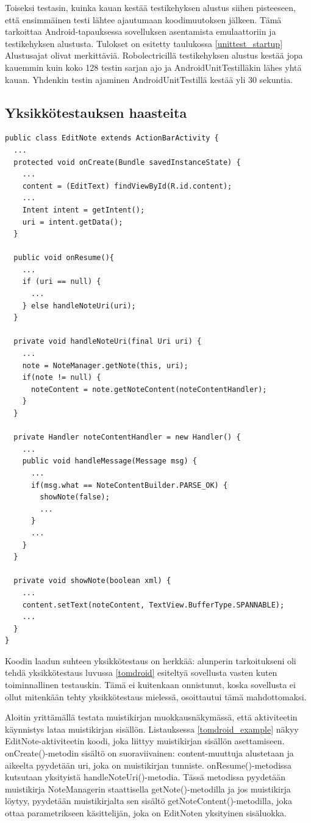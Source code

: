 Toiseksi testasin, kuinka kauan kestää testikehyksen alustus siihen pisteeseen, että ensimmäinen testi lähtee ajautumaan koodimuutoksen jälkeen. Tämä tarkoittaa Android-tapauksessa sovelluksen asentamista emulaattoriin ja testikehyksen alustusta. Tulokset on esitetty taulukossa \ref{unittest_startup} Alustusajat olivat merkittäviä. Robolectricillä testikehyksen alustus kestää jopa kauemmin kuin koko 128 testin sarjan ajo ja AndroidUnitTestilläkin lähes yhtä kauan. Yhdenkin testin ajaminen AndroidUnitTestillä kestää yli 30 sekuntia.

\subsection{Yksikkötestauksen haasteita}

\begin{lstlisting}[float, label=tomdroid_example,caption=Tomdroid-koodiesimerkki]
public class EditNote extends ActionBarActivity {
  ...
  protected void onCreate(Bundle savedInstanceState) {
    ...
    content = (EditText) findViewById(R.id.content);
    ...
    Intent intent = getIntent();
    uri = intent.getData();
  }  
  
  public void onResume(){
    ...
    if (uri == null) {
  	  ...
    } else handleNoteUri(uri);
  }

  private void handleNoteUri(final Uri uri) {
    ...
    note = NoteManager.getNote(this, uri);
    if(note != null) {
      noteContent = note.getNoteContent(noteContentHandler);
    }
  }
  
  private Handler noteContentHandler = new Handler() {
    ...
    public void handleMessage(Message msg) {
      ...
      if(msg.what == NoteContentBuilder.PARSE_OK) {
      	showNote(false);
      	...
      }
      ...
    }
  }
  
  private void showNote(boolean xml) {
    ...
    content.setText(noteContent, TextView.BufferType.SPANNABLE);
    ...
  }
}
\end{lstlisting}

Koodin laadun suhteen yksikkötestaus on herkkää: alunperin tarkoitukseni oli tehdä yksikkötestaus luvussa \ref{tomdroid} esiteltyä sovellusta vasten kuten toiminnallinen testauskin. Tämä ei kuitenkaan onnistunut, koska sovellusta ei ollut mitenkään tehty yksikkötestaus mielessä, osoittautui tämä mahdottomaksi.

Aloitin yrittämällä testata muistikirjan muokkausnäkymässä, että aktiviteetin käynnistys lataa muistikirjan sisällön. Listauksessa \ref{tomdroid_example} näkyy EditNote-aktiviteetin koodi, joka liittyy muistikirjan sisällön asettamiseen. onCreate()-metodin sisältö on suoraviivainen: content-muuttuja alustetaan ja aikeelta pyydetään uri, joka on muistikirjan tunniste. onResume()-metodissa kutsutaan yksityistä handleNoteUri()-metodia. Tässä metodissa pyydetään muistikirja NoteManagerin staattisella getNote()-metodilla ja jos muistikirja löytyy, pyydetään muistikirjalta sen sisältö getNoteContent()-metodilla, joka ottaa parametrikseen käsittelijän, joka on EditNoten yksityinen sisäluokka. 

